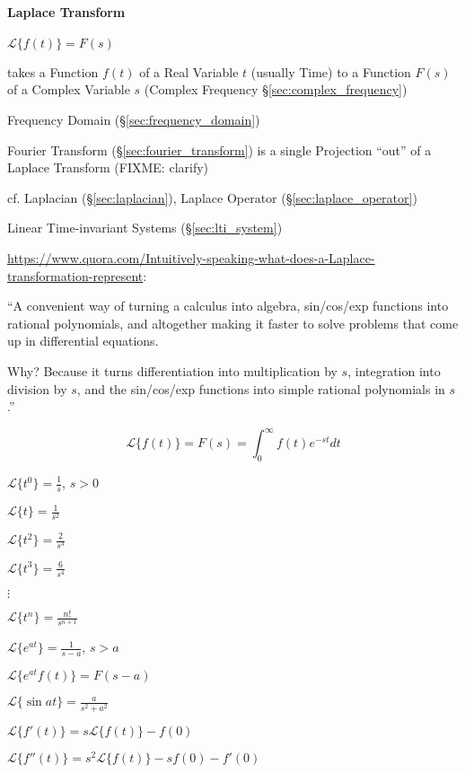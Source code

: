 \paragraph{Laplace Transform}\label{sec:laplace_transform}\hfill

$\mathcal{L}\{f(t)\} = F(s)$

takes a Function $f(t)$ of a Real Variable $t$ (usually Time) to a Function
$F(s)$ of a Complex Variable $s$ (Complex Frequency
\S\ref{sec:complex_frequency})

\fist Frequency Domain (\S\ref{sec:frequency_domain})

\fist Fourier Transform (\S\ref{sec:fourier_transform}) is a single Projection
``out'' of a Laplace Transform (FIXME: clarify)

\fist cf. Laplacian (\S\ref{sec:laplacian}), Laplace Operator
(\S\ref{sec:laplace_operator}) %

\fist Linear Time-invariant Systems (\S\ref{sec:lti_system})

\url{https://www.quora.com/Intuitively-speaking-what-does-a-Laplace-transformation-represent}:

``A convenient way of turning a calculus into algebra, sin/cos/exp functions
into rational polynomials, and altogether making it faster to solve problems
that come up in differential equations.

Why? Because it turns differentiation into multiplication by $s$, integration
into division by $s$, and the sin/cos/exp functions into simple rational
polynomials in $s$.''

\[
  \mathcal{L} \{ f(t) \} = F(s) = \int_0^\infty f(t) e^{-st} dt
\]

$\mathcal{L}\{t^0\} = \frac{1}{s}$, $s > 0$

$\mathcal{L}\{t\} = \frac{1}{s^2}$

$\mathcal{L}\{t^2\} = \frac{2}{s^3}$

$\mathcal{L}\{t^3\} = \frac{6}{s^4}$

$\vdots$

$\mathcal{L}\{t^n\} = \frac{n!}{s^{n+1}}$

$\mathcal{L}\{e^{at}\} = \frac{1}{s-a}$, $s > a$

$\mathcal{L}\{e^{at}f(t)\} = F(s-a)$

$\mathcal{L}\{\sin at\} = \frac{a}{s^2+a^2}$

$\mathcal{L}\{ f'(t) \} = s \mathcal{L} \{f(t)\} - f(0)$

$\mathcal{L}\{ f''(t) \} = s^2 \mathcal{L} \{f(t)\} - sf(0) - f'(0)$

